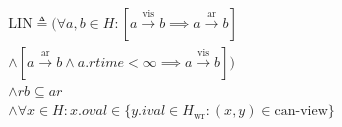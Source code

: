 \begin{align*}
  &\text{LIN} \triangleq (\forall a, b \in H: [a
    \xrightarrow{\text{vis}} b \implies a \xrightarrow{\text{ar}} b] \\
    &\land [a \xrightarrow{\text{ar}} b \land a.rtime < \infty \implies
  a \xrightarrow{\text{vis}} b]) \\
  &\land rb \subseteq ar \\
  &\land \forall x \in H: x.oval \in \{y.ival \in H_\text{wr} : (x,
  y) \in \text{can-view}\}
\end{align*}
